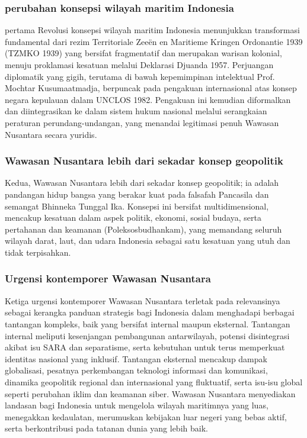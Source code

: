 \documentclass[12pt, a4paper]{article}
\begin{document}
\subsubsection*{perubahan konsepsi wilayah maritim Indonesia} \label{perubahan-konsepsi-wilayah-maritim-indonesia} pertama Revolusi konsepsi wilayah maritim Indonesia menunjukkan transformasi fundamental dari rezim Territoriale Zeeën en Maritieme Kringen Ordonantie 1939 (TZMKO 1939)\cite{TZMKO} yang bersifat fragmentatif dan merupakan warisan kolonial, menuju proklamasi kesatuan melalui Deklarasi Djuanda 1957. Perjuangan diplomatik yang gigih, terutama di bawah kepemimpinan intelektual Prof. Mochtar Kusumaatmadja, berpuncak pada pengakuan internasional atas konsep negara kepulauan dalam UNCLOS 1982. Pengakuan ini kemudian diformalkan dan diintegrasikan ke dalam sistem hukum nasional melalui serangkaian peraturan perundang-undangan, yang menandai legitimasi penuh Wawasan Nusantara secara yuridis.

\subsubsection*{Wawasan Nusantara lebih dari sekadar konsep geopolitik}
Kedua, Wawasan Nusantara lebih dari sekadar konsep geopolitik; ia adalah pandangan hidup bangsa yang berakar kuat pada falsafah Pancasila dan semangat Bhinneka Tunggal Ika. Konsepsi ini bersifat multidimensional, mencakup kesatuan dalam aspek politik, ekonomi, sosial budaya, serta pertahanan dan keamanan (Poleksosbudhankam), yang memandang seluruh wilayah darat, laut, dan udara Indonesia sebagai satu kesatuan yang utuh dan tidak terpisahkan.

\subsubsection*{Urgensi kontemporer Wawasan Nusantara} 
Ketiga urgensi kontemporer Wawasan Nusantara terletak pada relevansinya sebagai kerangka panduan strategis bagi Indonesia dalam menghadapi berbagai tantangan kompleks, baik yang bersifat internal maupun eksternal. Tantangan internal meliputi kesenjangan pembangunan antarwilayah, potensi disintegrasi akibat isu SARA dan separatisme, serta kebutuhan untuk terus memperkuat identitas nasional yang inklusif. Tantangan eksternal mencakup dampak globalisasi, pesatnya perkembangan teknologi informasi dan komunikasi, dinamika geopolitik regional dan internasional yang fluktuatif, serta isu-isu global seperti perubahan iklim dan keamanan siber. Wawasan Nusantara menyediakan landasan bagi Indonesia untuk mengelola wilayah maritimnya yang luas, menegakkan kedaulatan, merumuskan kebijakan luar negeri yang bebas aktif, serta berkontribusi pada tatanan dunia yang lebih baik.
\end{document}
